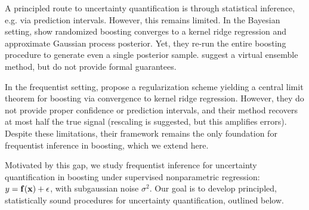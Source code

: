 
A principled route to uncertainty quantification is through statistical inference, e.g. via prediction intervals. However, this remains limited. In the Bayesian setting, \cite{ustimenko2023gradientboostingperformsgaussian} show randomized boosting converges to a kernel ridge regression and approximate Gaussian process posterior. Yet, they re-run the entire boosting procedure to generate even a single posterior sample. \cite{malinin2021uncertaintygradientboostingensembles} suggest a virtual ensemble method, but do not provide formal guarantees.

In the frequentist setting, \cite{zhou2022boulevard} propose a regularization scheme yielding a central limit theorem for boosting via convergence to kernel ridge regression. However, they do not provide proper confidence or prediction intervals, and their method recovers at most half the true signal (rescaling is suggested, but this amplifies errors). Despite these limitations, their framework remains the only foundation for frequentist inference in boosting, which we extend here.

\vspace{-1ex}
Motivated by this gap, we study frequentist inference for uncertainty quantification in boosting under supervised nonparametric regression: \(y = \mathbf{f}(\mathbf{x}) + \epsilon\), with subgaussian noise $\sigma^2$. Our goal is to develop principled, statistically sound procedures for uncertainty quantification, outlined below.
\vspace{-2.5ex}
